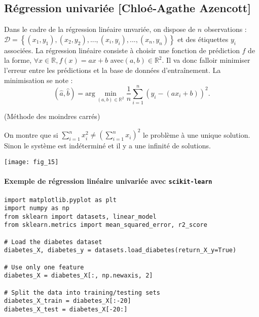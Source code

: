 {\subsection{Régression univariée [Chloé-Agathe Azencott]}

\begin{minipage}[c]{.6\linewidth}
Dans le cadre de la régression linéaire unvariée, on dispose de $n$ observations : $\mathcal{D}=\left\{ \left(x_1,y_1 \right), \left(x_2,y_2 \right), ..., \left(x_i,y_i \right), ..., \left(x_n,y_n \right)\right\}$ et des étiquettes $y_i$ associées. 
La régression linéaire consiste à choisir une fonction de prédiction $f$ de la forme, $\forall x \in \mathbb{R}, f(x)=ax+b$ avec$\left(a,b\right) \in \mathbb{R}^2$. Il va donc falloir minimiser l'erreur entre les prédictions et la base de données d’entraînement. La minimisation se note : 
$$ \left(\hat{a},\hat{b}\right)= \text{arg} \min\limits_{\left(a,b\right) \in \mathbb{R}^2} \dfrac{1}{n}\sum\limits_{i=1}^{n}\left( y_i - \left(ax_i +b\right) \right)^2.$$

(Méthode des moindres carrés)

On montre que si $\sum\limits_{i=1}^{n}x_i^2 \neq \left(\sum\limits_{i=1}^{n}x_i\right)^2 $ le problème à une unique solution. Sinon le système est indéterminé et il y a une infinité de solutions.
\end{minipage} \hfill
\begin{minipage}[c]{.35\linewidth}
\begin{center}
\texttt{[image: fig\_15]}
\end{center}
\end{minipage} 



\paragraph*{Exemple de régression linéaire univariée avec \texttt{scikit-learn}}
\begin{lstlisting}
import matplotlib.pyplot as plt
import numpy as np
from sklearn import datasets, linear_model
from sklearn.metrics import mean_squared_error, r2_score

# Load the diabetes dataset
diabetes_X, diabetes_y = datasets.load_diabetes(return_X_y=True)

# Use only one feature
diabetes_X = diabetes_X[:, np.newaxis, 2]

# Split the data into training/testing sets
diabetes_X_train = diabetes_X[:-20]
diabetes_X_test = diabetes_X[-20:]


\end{lstlisting}}
